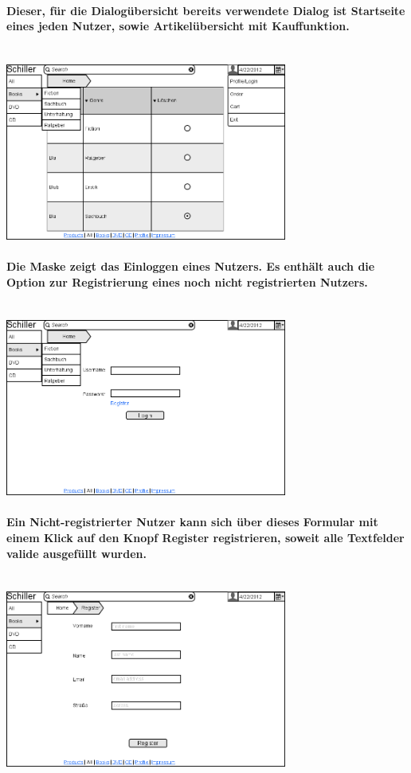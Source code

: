 \documentclass[a4paper]{article}
\begin{document}
\paragraph{Dieser, für die Dialogübersicht bereits verwendete Dialog ist Startseite eines jeden Nutzer, sowie Artikelübersicht mit Kauffunktion.\\ \\}
\includegraphics[width=350px]{1Home_Costumer.png}

\paragraph{Die Maske zeigt das Einloggen eines Nutzers. Es enthält auch die Option zur Registrierung eines noch nicht registrierten Nutzers.\\ \\}
\includegraphics[width=350px]{2Login.png}

\paragraph{Ein Nicht-registrierter Nutzer kann sich über dieses Formular mit einem Klick auf den Knopf Register registrieren, soweit alle Textfelder valide ausgefüllt wurden.\\ \\}
\includegraphics[width=350px]{3Register.png}
\end{document}
